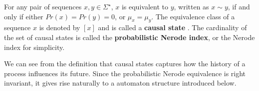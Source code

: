 \begin{defn}
\label{defn:NerodeEquiv}
For any pair of sequences $x, y\in\Sigma^{\star}$, $x$ is equivalent to $y$, written as $x\sim y$, if and only if either $Pr(x) = Pr(y) = 0$, or $\mu_x = \mu_y$. The equivalence class of a sequence $x$ is denoted by $[x]$ and is called a \textbf{causal state} \cite{chattopadhyay2014data}. The cardinality of the set of causal states is called the \textbf{probabilistic Nerode index}, or the Nerode index for simplicity.
\end{defn}
We can see from the definition that causal states captures how the history of a process influences its future. Since the probabilistic Nerode equivalence is right invariant, it gives rise naturally to a automaton structure introduced below.

